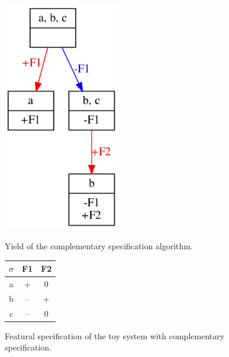 \documentclass[12pt, oneside]{article}   	%
\begin{document}
\begin{figure}
	\centering
	\begin{minipage}{0.45\textwidth}
		\centering
		\includegraphics[width=0.45\textwidth]{toy_system_complementary.png}
		\caption{Yield of the complementary specification algorithm.}
		\label{fig:toy_system_complementary}
	\end{minipage}
	\begin{minipage}{0.45\textwidth}
		\centering
		\captionsetup{type=table} %
	\begin{tabular} {|c||c|c|}
	\hline
	$\sigma$ & F1 & F2 \\ \hline
	a & + & 0 \\
	b & -- & + \\
	c & -- & 0 \\
	\hline
\end{tabular}
\caption{Featural specification of the toy system with complementary specification.}
\label{table:toy_system_complementary}
	\end{minipage}
\end{figure}

%
\end{document}
